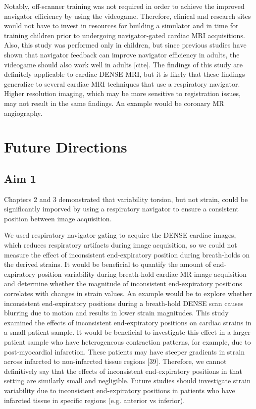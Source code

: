 	Notably, off-scanner training was not required in order to achieve the improved navigator efficiency by using the videogame. Therefore, clinical and research sites would not have to invest in resources for building a simulator and in time for training children prior to undergoing navigator-gated cardiac MRI acquisitions. Also, this study was performed only in children, but since previous studies have shown that navigator feedback can improve navigator efficiency in adults, the videogame should also work well in adults [cite]. The findings of this study are definitely applicable to cardiac DENSE MRI, but it is likely that these findings generalize to several cardiac MRI techniques that use a respiratory navigator. Higher resolution imaging, which may be more sensitive to registration issues, may not result in the same findings. An example would be coronary MR angiography.

\section{Future Directions}

\subsection{Aim 1}
	Chapters 2 and 3 demonstrated that variability torsion, but not strain, could be significantly imporved by using a respiratory navigator to ensure a consistent position between image acquisition.

	We used respiratory navigator gating to acquire the DENSE cardiac images, which reduces respiratory artifacts during image acquisition, so we could not measure the effect of inconsistent end-expiratory position during breath-holds on the derived strains. It would be beneficial to quantify the amount of end-expiratory position variability during breath-hold cardiac MR image acquisition and determine whether the magnitude of inconsistent end-expiratory positions correlates with changes in strain values. An example would be to explore whether inconsistent end-expiratory positions during a breath-hold DENSE scan causes blurring due to motion and results in lower strain magnitudes.
	This study examined the effects of inconsistent end-expiratory positions on cardiac strains in a small patient sample. It would be beneficial to investigate this effect in a larger patient sample who have heterogeneous contraction patterns, for example, due to post-myocardial infarction. These patients may have steeper gradients in strain across infarcted to non-infarcted tissue regions [39]. Therefore, we cannot definitively say that the effects of inconsistent end-expiratory positions in that setting are similarly small and negligible. Future studies should investigate strain variability due to inconsistent end-expiratory positions in patients who have infarcted tissue in specific regions (e.g. anterior vs inferior).


